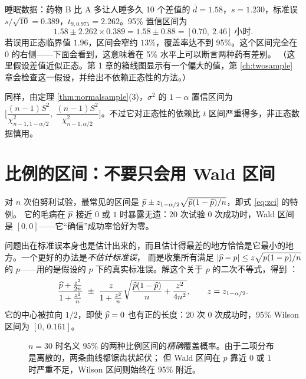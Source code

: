 \begin{casestudy}{睡眠数据：药物 B 比 A 多让人睡多久}
10 个差值的 $\bar d=1.58$，$s=1.230$，标准误 $s/\sqrt{10}=0.389$，$t_{9,0.975}=2.262$。95\% 置信区间为
\[
1.58\pm2.262\times0.389=1.58\pm0.88=[0.70,\ 2.46]\ \text{小时}.
\]
若误用正态临界值 $1.96$，区间会窄约 $13\%$，覆盖率达不到 95\%。这个区间完全在 $0$ 的右侧——下面会看到，这意味着在 5\% 水平上可以断言两种药有差别。
（这里假设差值近似正态。第 1 章的箱线图显示有一个偏大的值，第 \ref{ch:twosample} 章会检查这一假设，并给出不依赖正态性的方法。）
\end{casestudy}

同样，由定理 \ref{thm:normalsample}(3)，$\sigma^2$ 的 $1-\alpha$ 置信区间为
$\Big[\dfrac{(n-1)S^2}{\chi^2_{n-1,1-\alpha/2}},\ \dfrac{(n-1)S^2}{\chi^2_{n-1,\alpha/2}}\Big]$。不过它对正态性的依赖比 $t$ 区间严重得多，非正态数据慎用。

\section{比例的区间：不要只会用 Wald 区间}

对 $n$ 次伯努利试验，最常见的区间是  $\widehat{p}\pm z_{1-\alpha/2}\sqrt{\widehat{p}(1-\widehat{p})/n}$，即式 \eqref{eq:zci} 的特例。
它的毛病在 $\widehat{p}$ 接近 $0$ 或 $1$ 时暴露无遗：$20$ 次试验 $0$ 次成功时，Wald 区间是 $[0,0]$——它“确信”成功率恰好为零。

问题出在标准误本身也是估计出来的，而且估计得最差的地方恰恰是它最小的地方。一个更好的办法是\emph{不估计标准误}，
而是收集所有满足 $|\widehat{p}-p|\le z\sqrt{p(1-p)/n}$ 的 $p$——用的是假设的 $p$ 下的真实标准误。解这个关于 $p$ 的二次不等式，得到
：
\[
\frac{\hatt p+\frac{z^2}{2n}}{1+\frac{z^2}{n}}\ \pm\ \frac{z}{1+\frac{z^2}{n}}\sqrt{\frac{\hatt p(1-\hatt p)}{n}+\frac{z^2}{4n^2}},\qquad z=z_{1-\alpha/2}.
\]
它的中心被拉向 $1/2$，即使 $\widehat{p}=0$ 也有正的长度：$20$ 次 $0$ 次成功时，95\% Wilson 区间为 $[0,\,0.161]$。

\begin{figure}[H]
\centering
{}
\caption{$n=30$ 时名义 95\% 的两种比例区间的\emph{精确}覆盖概率。由于二项分布是离散的，两条曲线都锯齿状起伏；
但 Wald 区间在 $p$ 靠近 $0$ 或 $1$ 时严重不足，Wilson 区间则始终在 95\% 附近。}
\label{fig:propcover}
\end{figure}

